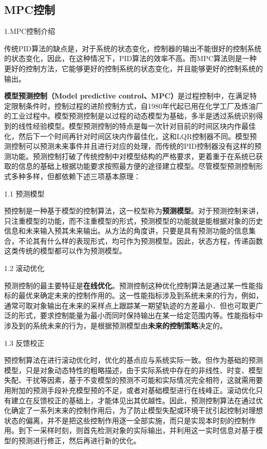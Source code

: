 \subsection{MPC控制}

1.MPC控制介绍

传统PID算法的缺点是，对于系统的状态变化，控制器的输出不能很好的控制系统的状态变化，因此，在这种情况下，PID算法的效率不高。而MPC算法则是一种更好的控制方法，它能够更好的控制系统的状态变化，并且能够更好的控制系统的输出。

\textbf{模型预测控制（Model predictive control、MPC）}是过程控制中，在满足特定限制条件时，控制过程的进阶控制方式，自1980年代起已用在化学工厂及炼油厂的工业过程中。模型预测控制是以过程的动态模型为基础，多半是透过系统识别得到的线性经验模型。模型预测控制的特点是每一次针对目前的时间区块内作最佳化，然后下一个时间再针对时间区块内作最佳化，这和LQR控制器不同。模型预测控制可以预测未来事件并且进行对应的处理，而传统的PID控制器没有这样的预测功能。预测控制打破了传统控制中对模型结构的严格要求，更着重于在系统已获取的信息的基础上根据功能要求按照最方便的途径建立模型。尽管模型预测控制形式多种多样，但都依赖下述三项基本原理：

1.1 预测模型

预控制是一种基于模型的控制算法，这一校型称为\textbf{预测模型}\cite{Art3}。对于预测控制来讲，只注重模型的功能，而不注重模型的形式，预测模型的功能就是能根据对象的历史信息和未来输入预其未来输出。从方法的角度讲，只要是具有预测功能的信息集合，不论其有什么样的表现形式，均可作为预测模型。因此，状态方程，传递函数这类传统的模型都可以作为预测模型。

1.2 滚动优化

预测控制的最主要特征是\textbf{在线优化}。预测控制这种优化控制算法是通过某一性能指标的最优来确定未来的控制作用的。这一性能指标涉及到系统未来的行为，例如，通常可取对象输出在未来的采样点上跟踪某一期望轨迹的方差最小．但也可取更广泛的形式，要求控制能量为最小而同时保持输出在某一给定范围内等。性能指标中涉及到的系统未来的行为，是根据预测模型由\textbf{未来的控制策略}决定的\cite{ArtE8}。

1.3 反馈校正

预控制算法在进行滚动优化时，优化的基点应与系统实际一致。但作为基础的预测模型，只是对象动态特性的粗略描述，由于实际系统中存在的非线性、时变、模型失配、干扰等因素，基于不变模型的预测不可能和实际情况完全相符，这就需用要用附加的预测手段补充模型预的不足，或者对基础模型进行在线峰正\cite{Art4}。滚动优化只有建立在反馈校正的基础上，才能体见出其优越性。因此，预测控制算法在通过优化确定了一系列末来的控制作用后，为了防止模型失配或环境干扰引起控制对理想状态的偏离，并不是把这些控制作用逐一全部实施，而只是实现本时刻的控制作用\cite{Art5}。到下一采样时刻，则首先检测对象的实际输出，并利用这一实时信息对基于模型的预测进行修正，然后再进行新的优化\cite{ArtE6}。

